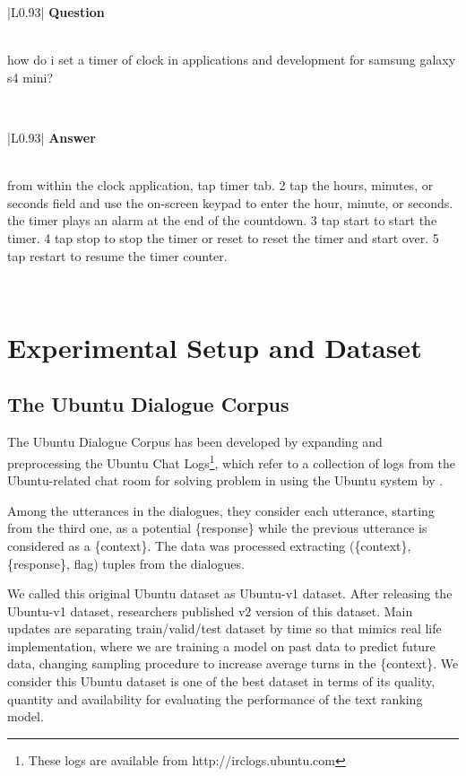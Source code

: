 \documentclass[11pt,a4paper]{article}
\newcommand\Tstrut{\rule{0pt}{2.0ex}}         \newcommand\Bstrut{\rule[-0.9ex]{0pt}{0pt}}
\begin{document}
\begin{table}[bh!]
\begin{tabular}{|L{0.93\columnwidth}|}
\hline
\textbf{Question} \Tstrut \\ 
\hline
how do i set a timer of clock in applications and development for samsung galaxy s4 mini?\Tstrut\\
\hline
\end{tabular}

\vskip 2mm

\begin{tabular}{|L{0.93\columnwidth}|}
\hline
\textbf{Answer} \Tstrut \\ 
 from within the clock application, tap timer tab. 2 tap the hours, minutes, or seconds field and use the on-screen keypad to enter the hour, minute, or seconds. the timer plays an alarm at the end of the countdown. 3 tap start to start the timer. 4 tap stop to stop the timer or reset to reset the timer and start over. 5 tap restart to resume the timer counter. \Tstrut \\
\hline
\end{tabular}

\caption{Example of the Samsung QA dataset.}
\label{t_sample_samsungQA}
\end{table} 

\section{Experimental Setup and Dataset}
\label{dataset}
\subsection{The Ubuntu Dialogue Corpus}
The Ubuntu Dialogue Corpus has been developed by expanding and preprocessing the Ubuntu Chat Logs\footnote{These logs are available from  http://irclogs.ubuntu.com}, which refer to a collection of logs from the Ubuntu-related chat room for solving problem in using the Ubuntu system by \cite{lowe2015ubuntu}.


Among the utterances in the dialogues, they consider each utterance, starting from the third one, as a potential \{response\} while the previous utterance is considered as a \{context\}. 
The data was processed extracting (\{context\}, \{response\}, flag) tuples from  the dialogues. 

We called this original Ubuntu dataset as Ubuntu-v1 dataset.
After releasing the Ubuntu-v1 dataset,
researchers published v2 version of this dataset.
Main updates are separating train/valid/test dataset by time so that mimics real life implementation, where we are training a model on past data to predict future data, changing sampling procedure to increase average turns in the \{context\}.
We consider this Ubuntu dataset is one of the best dataset in terms of its quality, quantity and availability for evaluating the performance of the text ranking model. 
\end{document}

